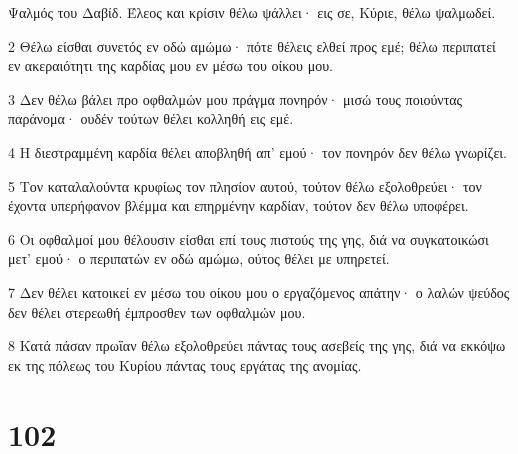 \par Ψαλμός του Δαβίδ. Έλεος και κρίσιν θέλω ψάλλει· εις σε, Κύριε, θέλω ψαλμωδεί.
\par 2 Θέλω είσθαι συνετός εν οδώ αμώμω· πότε θέλεις ελθεί προς εμέ; θέλω περιπατεί εν ακεραιότητι της καρδίας μου εν μέσω του οίκου μου.
\par 3 Δεν θέλω βάλει προ οφθαλμών μου πράγμα πονηρόν· μισώ τους ποιούντας παράνομα· ουδέν τούτων θέλει κολληθή εις εμέ.
\par 4 Η διεστραμμένη καρδία θέλει αποβληθή απ' εμού· τον πονηρόν δεν θέλω γνωρίζει.
\par 5 Τον καταλαλούντα κρυφίως τον πλησίον αυτού, τούτον θέλω εξολοθρεύει· τον έχοντα υπερήφανον βλέμμα και επηρμένην καρδίαν, τούτον δεν θέλω υποφέρει.
\par 6 Οι οφθαλμοί μου θέλουσιν είσθαι επί τους πιστούς της γης, διά να συγκατοικώσι μετ' εμού· ο περιπατών εν οδώ αμώμω, ούτος θέλει με υπηρετεί.
\par 7 Δεν θέλει κατοικεί εν μέσω του οίκου μου ο εργαζόμενος απάτην· ο λαλών ψεύδος δεν θέλει στερεωθή έμπροσθεν των οφθαλμών μου.
\par 8 Κατά πάσαν πρωΐαν θέλω εξολοθρεύει πάντας τους ασεβείς της γης, διά να εκκόψω εκ της πόλεως του Κυρίου πάντας τους εργάτας της ανομίας.

\chapter{102}

